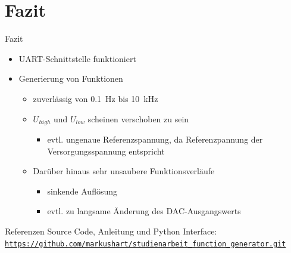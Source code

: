 \documentclass[11pt]{beamer}
\begin{document}
\section{Fazit}
\begin{frame}{Fazit}
  \begin{itemize}
  \item UART-Schnittstelle funktioniert
  \item Generierung von Funktionen
    \begin{itemize}
      \item zuverlässig von \SI{0.1}{\hertz} bis \SI{10}{\kilo\hertz}
      \item $U_{high}$ und $U_{low}$ scheinen verschoben zu sein
      \begin{itemize}
        \item evtl. ungenaue Referenzspannung, da Referenzpannung der Versorgungsspannung entspricht
      \end{itemize}
      \item Darüber hinaus sehr unsaubere Funktionsverläufe
      \begin{itemize}
        \item sinkende Auflösung
        \item evtl. zu langsame Änderung des DAC-Ausgangswerts
      \end{itemize}
    \end{itemize}
  \end{itemize}
\end{frame}

\begin{frame}{Referenzen}
  Source Code, Anleitung und Python Interface:\\ 
  \href{https://github.com/markushart/studienarbeit_function_generator.git}{\small\texttt{https://github.com/markushart/studienarbeit\_function\_generator.git}}
\end{frame}
\end{document}
